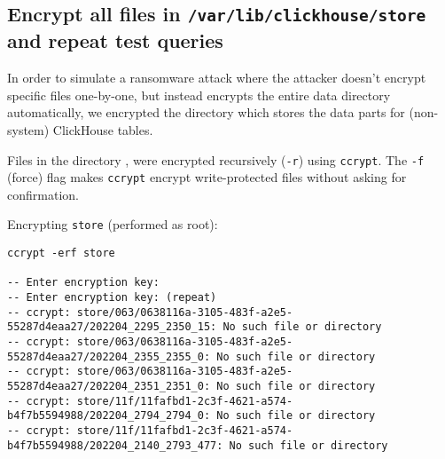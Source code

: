 \subsection{Encrypt all files in \texttt{/var/lib/clickhouse/store} and repeat test queries}
\label{sec:orgb28ee20}
In order to simulate a ransomware attack
where the attacker doesn't encrypt specific files one-by-one,
but instead encrypts the entire data directory automatically,
we encrypted the directory which stores the data parts for (non-system) ClickHouse tables.

Files in the directory ,
were encrypted recursively (\texttt{-r}) using \texttt{ccrypt}.
The \texttt{-f} (force) flag makes \texttt{ccrypt} encrypt write-protected files without asking for confirmation.

Encrypting \texttt{store} (performed as root):
\begin{verbatim}
ccrypt -erf store

-- Enter encryption key:
-- Enter encryption key: (repeat)
-- ccrypt: store/063/0638116a-3105-483f-a2e5-55287d4eaa27/202204_2295_2350_15: No such file or directory
-- ccrypt: store/063/0638116a-3105-483f-a2e5-55287d4eaa27/202204_2355_2355_0: No such file or directory
-- ccrypt: store/063/0638116a-3105-483f-a2e5-55287d4eaa27/202204_2351_2351_0: No such file or directory
-- ccrypt: store/11f/11fafbd1-2c3f-4621-a574-b4f7b5594988/202204_2794_2794_0: No such file or directory
-- ccrypt: store/11f/11fafbd1-2c3f-4621-a574-b4f7b5594988/202204_2140_2793_477: No such file or directory
\end{verbatim}

